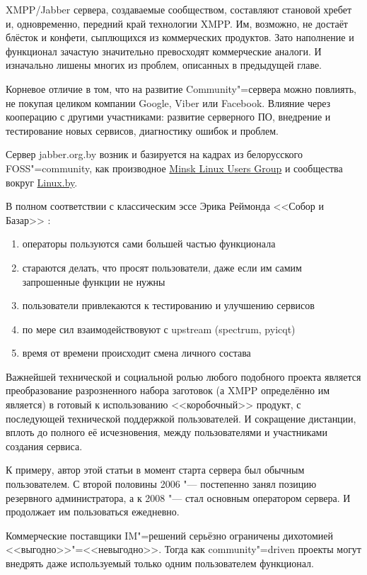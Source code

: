 \documentclass[10pt, a5paper]{article}
\begin{document}
XMPP/Jabber сервера, создаваемые сообществом, составляют становой хребет и, одновременно, передний край технологии XMPP. Им, возможно, не достаёт блёсток и конфети, сыплющихся из коммерческих продуктов. Зато наполнение и функционал зачастую значительно превосходят коммерческие аналоги. И изначально лишены многих из проблем, описанных в предыдущей главе.

Корневое отличие в том, что на развитие Community"=сервера можно повлиять, не покупая целиком компании Google, Viber или Facebook. Влияние через кооперацию с другими участниками: развитие серверного ПО, внедрение и тестирование новых сервисов, диагностику ошибок и проблем.

Сервер jabber.org.by возник и базируется на кадрах из белорусского FOSS"=community, как производное \href{http://mlug.linux.by}{Minsk Linux Users Group}  и сообщества вокруг \href{http://forum.linux.by}{Linux.by}.

В полном соответствии с классическим эссе Эрика Реймонда <<Собор и Базар>> \footnotemark[2]:

\begin{enumerate}
  \item операторы пользуются сами большей частью функционала
  \item стараются делать, что просят пользователи, даже если им самим запрошенные функции не нужны
  \item пользователи привлекаются к тестированию и улучшению  сервисов
  \item по мере сил взаимодействовуют с upstream (spectrum, pyicqt)
  \item время от времени происходит смена личного состава
\end{enumerate}

Важнейшей технической и социальной ролью любого подобного проекта является преобразование разрозненного набора заготовок (а XMPP определённо им является) в готовый к использованию <<коробочный>> продукт, с последующей технической поддержкой пользователей. И сокращение дистанции, вплоть до полного её исчезновения, между пользователями и участниками создания сервиса.

К примеру, автор этой статьи в момент старта сервера был обычным пользователем. С второй половины 2006 "--- постепенно занял позицию резервного администратора, а к 2008 "--- стал основным оператором сервера. И продолжает им пользоваться ежедневно.

Коммерческие поставщики IM"=решений серьёзно ограничены дихотомией <<выгодно>>"=<<невыгодно>>. Тогда как community"=driven проекты могут внедрять даже используемый только одним пользователем функционал.
\end{document}
